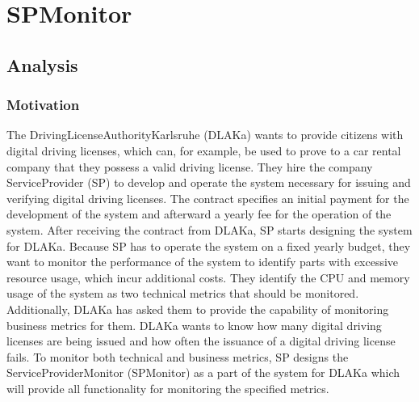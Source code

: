 \chapter{SPMonitor}





\section{Analysis}


\subsection{Motivation}
The DrivingLicenseAuthorityKarlsruhe (DLAKa) wants to provide citizens with digital driving licenses,
which can, for example, be used to prove to a car rental company that they possess a valid driving license.
They hire the company ServiceProvider (SP) to develop and operate the system necessary for issuing and verifying
digital driving licenses. The contract specifies an initial payment for the development of the system
and afterward a yearly fee for the operation of the system.
After receiving the contract from DLAKa, SP starts designing the system
for DLAKa. Because SP has to operate the system on a fixed yearly budget,
they want to monitor the performance of the system to identify parts with excessive resource usage, which
incur additional costs. They identify the CPU and memory usage of the system as two technical metrics that should be monitored.
Additionally, DLAKa has asked them to provide the capability of monitoring business metrics for them.
DLAKa wants to know how many digital driving licenses are being issued and how often the issuance of a digital
driving license fails. To monitor both technical and business metrics, SP designs the ServiceProviderMonitor (SPMonitor) as a part
of the system for DLAKa which will provide all functionality for monitoring the specified metrics.

